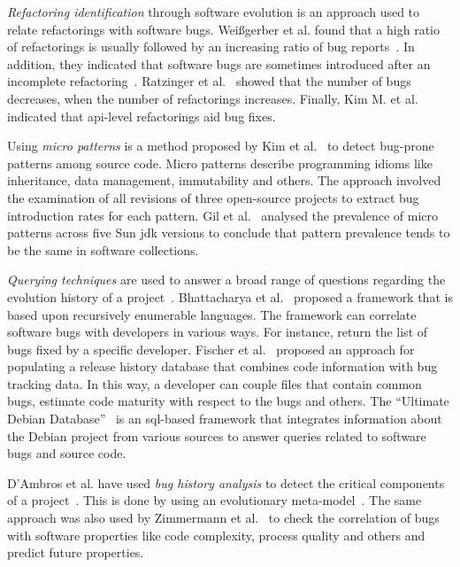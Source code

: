 \documentclass[conference]{llncs}
\begin{document}
{\it Refactoring identification} through software evolution is an approach used to
relate refactorings with software bugs. Wei{\ss}gerber et al. found that a high
ratio of refactorings is usually followed by an increasing ratio of bug
reports~\cite{WD06}. In addition, they indicated that software bugs are sometimes introduced
after an incomplete refactoring~\cite{GW05}.
Ratzinger et al.~\cite{RSG08} showed that the number of bugs decreases, when the number of
refactorings increases. Finally, Kim M. et al.~\cite{KCK11} indicated that {\sc api}-level
refactorings aid bug fixes.

Using {\it micro patterns} is a method proposed by Kim et al.~\cite{KPW06}
to detect bug-prone patterns among source code. Micro patterns describe programming
idioms like inheritance, data management, immutability and others. The approach involved
the examination of all revisions of three open-source projects to extract bug
introduction rates for each pattern. Gil et al.~\cite{GM05} analysed the
prevalence of micro patterns across five Sun {\sc jdk} versions to conclude that
pattern prevalence tends to be the same in software collections.

{\it Querying techniques} are used to answer a broad range of questions
regarding the evolution history of a project~\cite{HG05}. Bhattacharya et
al.~\cite{BN11}\cite{B11} proposed a framework that is based upon
recursively enumerable languages. The framework can correlate software
bugs with developers in various ways. For instance, return the list of
bugs fixed by a specific developer. Fischer et al.~\cite{FPG03} proposed
an approach for populating a release history database that combines code
information with bug tracking data. In this way, a developer can couple files
that contain common bugs, estimate code maturity with respect to the bugs
and others. The ``Ultimate Debian Database''~\cite{NZ10} is an {\sc sql}-based
framework that integrates information about the Debian project from various
sources to answer queries related to software bugs and source code.

D'Ambros et al. have used {\it bug history analysis} to detect
the critical components of a project~\cite{D08}. This is done by using an
evolutionary meta-model~\cite{DL08}. The same approach was
also used by Zimmermann et al.~\cite{ZNA08} to check the correlation
of bugs with software properties like code complexity, process quality and others
and predict future properties.
\end{document}
